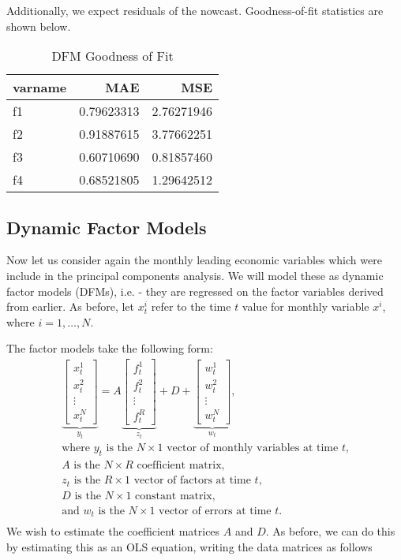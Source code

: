 \documentclass[11pt, letterpaper]{article}\usepackage[]{graphicx}\usepackage[]{color}
\begin{document}
Additionally, we expect residuals of the nowcast. Goodness-of-fit statistics are shown below.
\begin{table}[H]
\centering
\begingroup\footnotesize
\begin{tabular}{lrr}
  \hline
varname & MAE & MSE \\ 
  \hline
f1 & 0.79623313 & 2.76271946 \\ 
  f2 & 0.91887615 & 3.77662251 \\ 
  f3 & 0.60710690 & 0.81857460 \\ 
  f4 & 0.68521805 & 1.29642512 \\ 
   \hline
\end{tabular}
\endgroup
\caption{DFM Goodness of Fit} 
\end{table}




\subsection{Dynamic Factor Models}
Now let us consider again the monthly leading economic variables which were include in the principal components analysis. We will model these as dynamic factor models (DFMs), i.e. - they are regressed on the factor variables derived from earlier. As before, let $x^i_t$ refer to the time $t$ value for monthly variable $x^i$, where $i = 1, \dots, N$.

The factor models take the following form:
\begin{align*}
\underbrace{\begin{bmatrix}
	x^1_t\\
	x^2_t\\
	\vdots \\
	x^N_t
\end{bmatrix}}_{y_t}
=
A
\underbrace{\begin{bmatrix}
	f^1_{t}\\
	f^2_{t}\\
	\vdots \\
	f^R_{t}
\end{bmatrix}}_{z_t}
+
D 
+
\underbrace{\begin{bmatrix}
	w^1_t\\
	w^2_t\\
	\vdots\\
	w^N_t
\end{bmatrix}}_{w_t},\\
\text{where $y_t$ is the $N \times 1$ vector of monthly variables at time $t$,}\\
\text{$A$ is the $N \times R$ coefficient matrix,}\\
\text{$z_t$ is the $R \times 1$ vector of factors at time $t$,}\\
\text{$D$ is the $N \times 1$ constant matrix,}\\
\text{and $w_t$ is the $N \times 1$ vector of errors at time $t$.}\\
\end{align*}
We wish to estimate the coefficient matrices $A$ and $D$. As before, we can do this by estimating this as an OLS equation, writing the data matrices as follows
\end{document}
